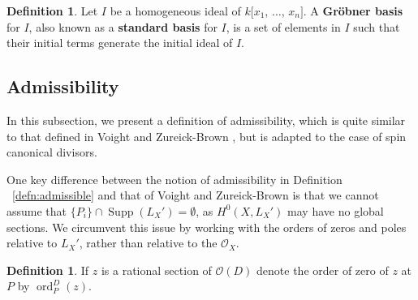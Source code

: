 \documentclass{amsart}
\theoremstyle{plain}
\theoremstyle{definition}
\newtheorem{defn}[thm]{Definition}
\theoremstyle{remark}
\numberwithin{equation}{section}
\newcommand\ssec{\subsection}
\newcommand\sco{{\mathscr O}}
\DeclareMathOperator{\ord}{ord}
\newcommand{\halfcan}{L}
\DeclareMathOperator{\Supp}{Supp}
\begin{document}

\begin{defn}
\label{defn:grobner-basis}
Let $I$ be a homogeneous ideal of $k[x_{1}$, $\ldots$,
$x_{n}]$. A \textbf{Gr\"obner basis} for $I$, also known as a
\textbf{standard basis} for $I$, is a set of elements in $I$
such that their initial terms generate the initial
ideal of $I$.
\end{defn}

\ssec{Admissibility}

In this subsection, we present a definition of admissibility, which is quite similar to that defined in Voight and Zureick-Brown \cite[Definition 8.5.1]{vzb:stacky}, but is adapted to the case of spin canonical divisors.

One key difference between the notion of admissibility in Definition ~\ref{defn:admissible} and that of Voight and Zureick-Brown \cite[Definition 8.5.1]{vzb:stacky} is that 
	we cannot assume that $\{P_i\} \cap \Supp(L_X') = \emptyset$, as $H^0(X, \halfcan_X')$ may have no global sections. We circumvent this issue by working with the orders of zeros and poles relative to $L_X'$, rather than relative to the $\sco_X$.

\begin{defn}
\label{def:order-sup}
If $z$ is a rational section of $\sco(D)$ denote the order of
zero of $z$ at $P$ by $\ord_P^D(z)$.
\end{defn}
\end{document}
